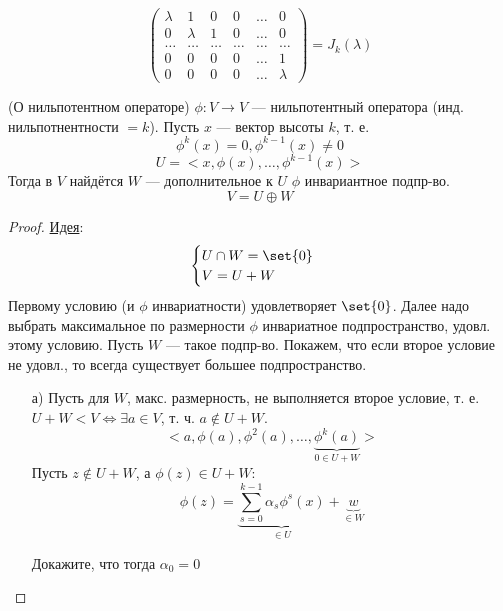 \[
  \begin{pmatrix} \lambda & 1 & 0 & 0 & \ldots & 0 \\ 0 & \lambda & 1 & 0 & \ldots & 0 \\ \ldots & \ldots & \ldots & \ldots & \ldots & \ldots \\ 0 & 0 & 0 & 0 & \ldots & 1 \\ 0 & 0 & 0 & 0 & \ldots & \lambda \end{pmatrix} = J_k(\lambda)
\]

\begin{theorem}(О нильпотентном операторе)
\label{theorem:05_4}
  $\phi \colon V \rightarrow V$ --- нильпотентный оператора (инд. нильпотнентности $= k$). Пусть $x$ --- вектор высоты $k$, т. е.
  \[
    \phi^{k}(x) = 0, \phi^{k - 1}(x) \neq 0
  \]
  \[
  U = <x, \phi(x), \ldots, \phi^{k - 1}(x)>
  \]
  Тогда в $V$ найдётся $W$ --- дополнительное к $U$ $\phi$ инвариантное подпр-во.
  \[
    V = U \oplus W
  \]
\end{theorem}
\begin{proof}
\underline{Идея}: 
\[
\begin{cases}
  U \cap W = \set{0} \\
  V = U + W
\end{cases}
\]
Первому условию (и $\phi$ инвариатности) удовлетворяет $\set{0}$. Далее надо выбрать максимальное по размерности $\phi$ инвариатное подпространство, удовл. этому условию. Пусть $W$ --- такое подпр-во. Покажем, что если второе условие не удовл., то всегда существует большее подпространство. \\
\begin{itemize}
  \item [а) ]
Пусть для $W$, макс. размерность, не выполняется второе условие, т. е. $U + W < V \iff \exists a \in V$, т. ч. $a \not\in U + W$.
\[
  <a, \phi(a), \phi^{2}(a), \ldots, \underbrace{\phi^{k}(a)}_{0 \in U + W}>
\]
Пусть $z \not\in U + W$, а $\phi(z) \in U + W$:
\[
  \phi(z) = \underbrace{\sum_{s = 0}^{k - 1}\alpha_s \phi^{s}(x)}_{\in U} + \underbrace{w}_{\in W}
\]
\begin{task}
  Докажите, что тогда $\alpha_0 = 0$
\end{task} 
\end{itemize}
\end{proof}
